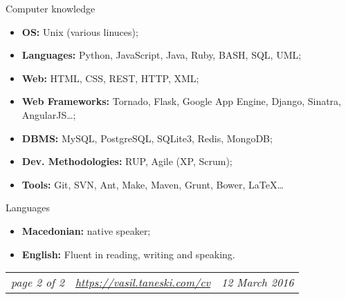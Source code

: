 \documentclass[]{mcdowellcv}
\begin{document}
    \begin{cvsection}{Computer knowledge}
    \label{Computer knowledge}
        \begin{cvsubsection}{}{}{}
            \begin{itemize}
                \item \textbf{OS:} Unix (various linuces);
                \item \textbf{Languages:} Python, JavaScript, Java, Ruby, BASH, SQL, UML;
                \item \textbf{Web:} HTML, CSS, REST, HTTP, XML;
                \item \textbf{Web Frameworks:} Tornado, Flask, Google App Engine, Django, Sinatra, AngularJS\ldots;
                \item \textbf{DBMS:} MySQL, PostgreSQL, SQLite3, Redis, MongoDB;
                \item \textbf{Dev. Methodologies:} RUP, Agile (XP, Scrum);
                \item \textbf{Tools:} Git, SVN, Ant, Make, Maven, Grunt, Bower, \LaTeX\ldots
            \end{itemize}
        \end{cvsubsection}
    \end{cvsection}

    \begin{cvsection}{Languages}
    \label{Languages}
        \begin{cvsubsection}{}{}{}
            \begin{itemize}
                \item \textbf{Macedonian:} native speaker;
                \item \textbf{English:} Fluent in reading, writing and speaking.
            \end{itemize}
        \end{cvsubsection}
    \end{cvsection}
    \vfill
    \begin{tabu} to 1\textwidth {X[l,m] X[c,m] X[r,m]}
        \textit{page 2 of 2} &
        \textit{\url{https://vasil.taneski.com/cv}} &
        \textit{12 March 2016}
    \end{tabu}
    \clearpage
\end{document}
